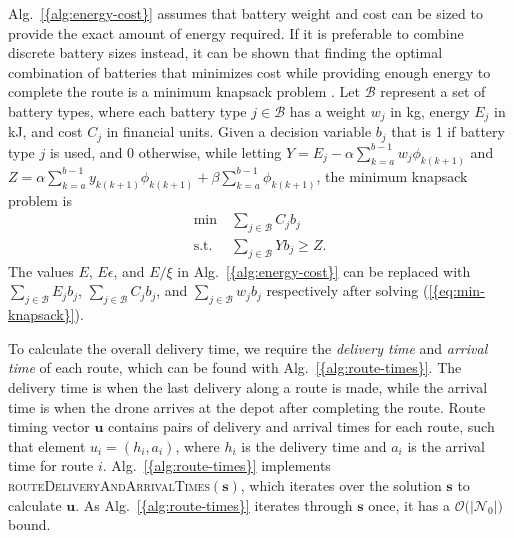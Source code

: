 \documentclass[journal]{IEEEtran}
\begin{document}
{Alg.~\ref{{alg:energy-cost}}} assumes that battery weight and cost can be sized to provide the exact amount of energy required. If it is preferable to combine discrete battery sizes instead, it can be shown that finding the optimal combination of batteries that minimizes cost while providing enough energy to complete the route is a minimum knapsack problem \cite{Kellerer2004}. Let ${\ensuremath{\mathcal{B}}}$ represent a set of battery types, where each battery type $j\in{\ensuremath{\mathcal{B}}}$ has a weight ${\ensuremath{w_{{j}}}}$ in kg, energy ${\ensuremath{E_{{j}}}}$ in kJ, and cost ${\ensuremath{C_{{j}}}}$ in financial units. Given a decision variable ${\ensuremath{b_{{j}}}}$ that is 1 if battery type $j$ is used, and 0 otherwise, while letting ${\ensuremath{Y}}={\ensuremath{E_{{j}}}} - {\ensuremath{\alpha}} \sum_{k=a}^{b-1} {\ensuremath{w_{{j}}}}{\ensuremath{\phi_{{k} {(k+1)}}}}$ and ${\ensuremath{Z}}= {\ensuremath{\alpha}} \sum_{k=a}^{b-1} {\ensuremath{{\ensuremath{y}}_{{k} {(k+1)}}}} {\ensuremath{\phi_{{k} {(k+1)}}}} + {\ensuremath{\beta}} \sum_{k=a}^{b-1} {\ensuremath{\phi_{{k} {(k+1)}}}}$, the minimum knapsack problem is
\begin{align}
\label{eq:min-knapsack}
\min \ & {\ensuremath{\sum_{{j} \in {\ensuremath{\mathcal{B}}}}}}{\ensuremath{C_{{j}}}}{\ensuremath{b_{{j}}}} \\
\text{s.t.} \ & {\ensuremath{\sum_{{j} \in {\ensuremath{\mathcal{B}}}}}}{\ensuremath{Y}}{\ensuremath{b_{{j}}}} \ge {\ensuremath{Z}}. \nonumber
\end{align}
The values ${\ensuremath{E}}$, ${\ensuremath{E}} \epsilon$, and ${\ensuremath{E}} / \xi$ in {Alg.~\ref{{alg:energy-cost}}} can be replaced with ${\ensuremath{\sum_{{j} \in {\ensuremath{\mathcal{B}}}}}}{\ensuremath{E_{{j}}}}{\ensuremath{b_{{j}}}}$, ${\ensuremath{\sum_{{j} \in {\ensuremath{\mathcal{B}}}}}}{\ensuremath{C_{{j}}}}{\ensuremath{b_{{j}}}}$, and ${\ensuremath{\sum_{{j} \in {\ensuremath{\mathcal{B}}}}}}{\ensuremath{w_{{j}}}}{\ensuremath{b_{{j}}}}$ respectively after solving {(\ref{{eq:min-knapsack}})}.

To calculate the overall delivery time, we require the \emph{delivery time} and \emph{arrival time} of each route, which can be found with {Alg.~\ref{{alg:route-times}}}. The delivery time is when the last delivery along a route is made, while the arrival time is when the drone arrives at the depot after completing the route. Route timing vector ${\ensuremath{\mathbf{u}}}$ contains pairs of delivery and arrival times for each route, such that element ${\ensuremath{u_{{i}}}} = ({\ensuremath{h_{{i}}}},{\ensuremath{a_{{i}}}})$, where ${\ensuremath{h_{{i}}}}$ is the delivery time and ${\ensuremath{a_{{i}}}}$ is the arrival time for route $i$. {Alg.~\ref{{alg:route-times}}} implements \textsc{routeDeliveryAndArrivalTimes}$({\ensuremath{\mathbf{s}}})$, which iterates over the solution ${\ensuremath{\mathbf{s}}}$ to calculate ${\ensuremath{\mathbf{u}}}$. As {Alg.~\ref{{alg:route-times}}} iterates through ${\ensuremath{\mathbf{s}}}$ once, it has a ${\ensuremath{\mathcal{O}\bigl({|{\ensuremath{{\ensuremath{\mathcal{N}}}_{0}}}|}\bigr)}}$ bound.
\end{document}
